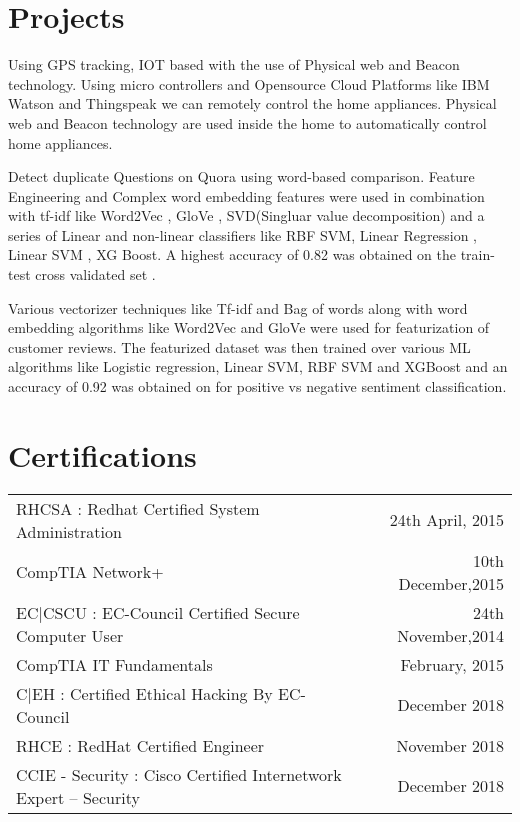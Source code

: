 \documentclass[]{deedy-resume-openfont}
\begin{document}
\begin{minipage}[t]{0.66\textwidth}

\section{Projects}
Using GPS tracking, IOT based with the use of Physical web and Beacon technology.
Using micro controllers and Opensource Cloud Platforms like IBM Watson and Thingspeak we can remotely control the home appliances. Physical web and Beacon technology are used inside the home to automatically control home appliances.

Detect duplicate Questions on Quora using word-based comparison. Feature Engineering and Complex word embedding features were used in combination with tf-idf like Word2Vec , GloVe , SVD(Singluar value decomposition) and a series of Linear and non-linear classifiers like RBF SVM, Linear Regression , Linear SVM , XG Boost. A highest accuracy of 0.82 was obtained on the train-test cross validated set .

\descript{}
Various vectorizer techniques like Tf-idf and Bag of words along with word
embedding algorithms like Word2Vec and GloVe were used for featurization of
customer reviews. The featurized dataset was then trained over various ML
algorithms like Logistic regression, Linear SVM, RBF SVM and XGBoost and an
accuracy of 0.92 was obtained on for positive vs negative sentiment classification.


\section{Certifications} 
\begin{tabular}{lr}
\textbullet{} RHCSA : Redhat Certified System Administration & 24th April, 2015\\
\textbullet{} CompTIA Network+	& 10th December,2015 \\
\textbullet{} EC|CSCU : EC-Council Certified Secure Computer User	 & 24th November,2014   \\
\textbullet{} CompTIA IT Fundamentals	 & February, 2015   \\
\textbullet{} C|EH : Certified Ethical Hacking By EC-Council & December 2018\\
\textbullet{} RHCE : RedHat Certified Engineer & November 2018\\
\textbullet{} CCIE - Security : Cisco Certified Internetwork Expert – Security & December 2018\\
\end{tabular}


\end{minipage}
\end{document}
